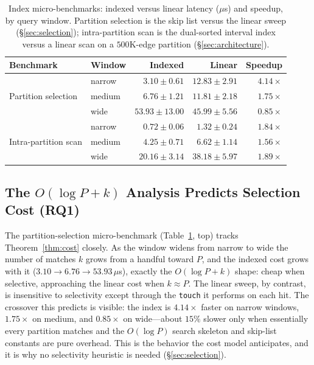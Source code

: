 \documentclass[10pt]{article}
\theoremstyle{definition}
\begin{document}
\begin{table}[t]
\centering
\caption{Index micro-benchmarks: indexed versus linear latency ($\mu$s) and
speedup, by query window. Partition selection is the skip list versus the linear
sweep (\S\ref{sec:selection}); intra-partition scan is the dual-sorted interval
index versus a linear scan on a $500$K-edge partition (\S\ref{sec:architecture}).}
\label{tab:micro}
\begin{tabular}{llrrr}
\toprule
Benchmark & Window & Indexed & Linear & Speedup \\
\midrule
\multirow{3}{*}{Partition selection}
 & narrow & $3.10\pm0.61$  & $12.83\pm2.91$ & $\mathbf{4.14\times}$ \\
 & medium & $6.76\pm1.21$  & $11.81\pm2.18$ & $1.75\times$ \\
 & wide   & $53.93\pm13.00$& $45.99\pm5.56$ & $0.85\times$ \\
\midrule
\multirow{3}{*}{Intra-partition scan}
 & narrow & $0.72\pm0.06$  & $1.32\pm0.24$  & $1.84\times$ \\
 & medium & $4.25\pm0.71$  & $6.62\pm1.14$  & $1.56\times$ \\
 & wide   & $20.16\pm3.14$ & $38.18\pm5.97$ & $1.89\times$ \\
\bottomrule
\end{tabular}
\end{table}

\subsection{The $O(\log P + k)$ Analysis Predicts Selection Cost (RQ1)}
\label{sec:rq1}

The partition-selection micro-benchmark (Table~\ref{tab:micro}, top) tracks
Theorem~\ref{thm:cost} closely. As the window widens from narrow to wide the number
of matches $k$ grows from a handful toward $P$, and the indexed cost grows with it
($3.10\!\rightarrow\!6.76\!\rightarrow\!53.93\,\mu$s), exactly the $O(\log P + k)$
shape: cheap when selective, approaching the linear cost when $k\approx P$. The
linear sweep, by contrast, is insensitive to selectivity except through the
\texttt{touch} it performs on each hit. The crossover this predicts is visible: the
index is $4.14\times$ faster on narrow windows, $1.75\times$ on medium, and
$0.85\times$ on wide---about $15\%$ slower only when essentially every partition
matches and the $O(\log P)$ search skeleton and skip-list constants are pure
overhead. This is the behavior the cost model anticipates, and it is why no
selectivity heuristic is needed (\S\ref{sec:selection}).
\end{document}
